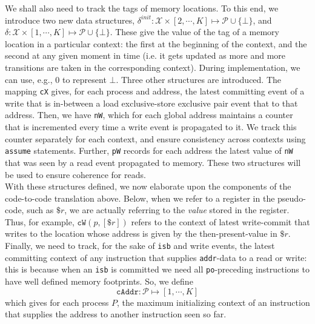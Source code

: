 \documentclass{article}
\newcommand{\var}{\texttt}
\begin{document}
We shall also need to track the tags of memory locations. To this end, we introduce two new data structures, $\delta^{init} : \mathcal{X} \times [2,\cdots,K] \mapsto \mathcal{P} \cup \{\bot\}$, and $\delta : \mathcal{X} \times [1,\cdots,K] \mapsto \mathcal{P} \cup \{\bot\}$. These give the value of the tag of a memory location in a particular context: the first at the beginning of the context, and the second at any given moment in time (i.e. it gets updated as more and more transitions are taken in the corresponding context). During implementation, we can use, e.g., $0$ to represent $\bot$. Three other structures are introduced. The mapping \var{cX} gives, for each process and address, the latest committing event of a write that is in-between a load exclusive-store exclusive pair event that to that address. Then, we have \var{nW}, which for each global address maintains a counter that is incremented every time a write event is propagated to it. We track this counter separately for each context, and ensure consistency across contexts using \var{assume} statements. Further, \var{pW} records for each address the latest value of \var{nW} that was seen by a read event propagated to memory. These two structures will be used to ensure coherence for reads.
\\With these structures defined, we now elaborate upon the components of the code-to-code translation above. Below, when we refer to a register in the pseudo-code, such as $\$r$, we are actually referring to the \textit{value} stored in the register. Thus, for example, $\var{cW}(p,[\$r])$ refers to the context of latest write-commit that writes to the location whose address is given by the then-present-value in $\$r$.\\
Finally, we need to track, for the sake of \var{isb} and write events, the latest committing context of any instruction that supplies \var{addr}-data to a read or write: this is because when an \var{isb} is committed we need all \var{po}-preceding instructions to have well defined memory footprints. So, we define
$$ \var{cAddr}: \mathcal{P} \mapsto [1,\cdots,K]$$
which gives for each process $P$, the maximum initializing context of an instruction that supplies the address to another instruction seen so far.
\end{document}
